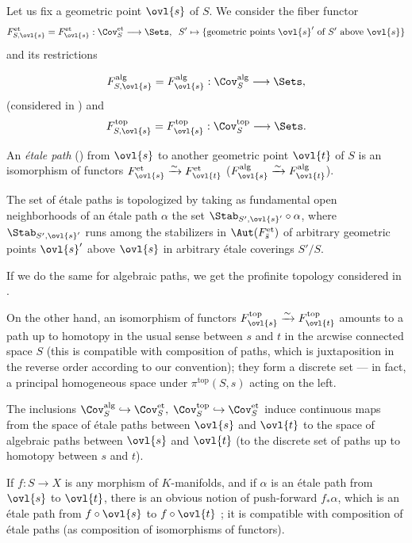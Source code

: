 \begin{para}\label{para::1.3.1} Let us fix a geometric point $\ovl{s}$ of
 $S$. We consider the fiber functor 
 \begin{equation*}
  F^{\mathrm{et}}_{S,\ovl{s}}=F^{\mathrm{et}}_{\ovl{s}} :
   \Cov^{\mathrm{et}}_S \longrightarrow \Sets,\;\; S' \mapsto
   \{\text{geometric points $\ovl{s}'$ of $S'$ above $\ovl{s}$}\}
 \end{equation*}
and its restrictions

\begin{equation*}
 F^{\mathrm{alg}}_{S,\ovl{s}}=F^{\mathrm{alg}}_{\ovl{s}}:
 \Cov^{\mathrm{alg}}_S\longrightarrow \Sets,
\end{equation*}
(considered in \cite{sga1}) and
\begin{equation*}
 F^{\mathrm{top}}_{S,\ovl{s}}=F^{\mathrm{top}}_{\ovl{s}}:
  \Cov^{\mathrm{top}}_S\longrightarrow \Sets.
\end{equation*} 

 An {\it \'etale path} () from
 $\ovl{s}$ to another geometric point $\ovl{t}$ of $S$ is an isomorphism
 of functors $F^{\mathrm{et}}_{\ovl{s}} \xrightarrow{\sim}
 F^{\mathrm{et}}_{\ovl{t}}$ (\resp $F^{\mathrm{alg}}_{\ovl{s}}
 \xrightarrow{\sim} F^{\mathrm{alg}}_{\ovl{t}}$). 

 The set of \'etale paths is topologized by taking as fundamental open
 neighborhoods of an \'etale path $\alpha$ the set 
 $\Stab_{S',\ovl{s}'}\circ \alpha$, where $\Stab_{S',\ovl{s}'}$ runs among
 the stabilizers in $\Aut(F_{\bar{s}}^{\mathrm{et}})$ of arbitrary geometric
 points $\ovl{s}'$ above 
 $\ovl{s}$ in arbitrary \'etale coverings $S'/S$.

 If we do the same for algebraic paths, we get the profinite topology
 considered in \cite{sga1}. 

 On the other hand, an isomorphism of functors
 $F^{\mathrm{top}}_{\ovl{s}} \xrightarrow{\sim}
 F^{\mathrm{top}}_{\ovl{t}}$ amounts to a path up to homotopy in the
 usual sense between $s$ and $t$ in the arcwise connected space $S$
 (this is compatible with composition of paths, which is juxtaposition
 in the reverse order according to our convention); they form a
 discrete set --- in fact, a principal homogeneous space under 
 $\pi^{\mathrm{top}}(S,s)$ acting on the left. 

 \medskip The inclusions $ \Cov^{\mathrm{alg}}_S \hookrightarrow
 \Cov^{\mathrm{et}}_S ,\;\Cov^{\mathrm{top}}_S \hookrightarrow
 \Cov^{\mathrm{et}}_S$ induce continuous maps from the space of \'etale
 paths between $\ovl{s}$ and $\ovl{t}$ to the space of algebraic paths
 between $\ovl{s}$ and $\ovl{t}$ (\resp to the discrete set of paths up
 to homotopy between $s$ and $t$).

 \medskip\noindent If $f: S\to X$ is any morphism of $K$-manifolds, and
 if $\alpha$ is an \'etale path from $\ovl{s}$ to $\ovl{t}$, there is an 
 obvious notion of push-forward $f_\ast\alpha$, which is an \'etale path
 from $f\circ \ovl{s}$ to $f\circ \ovl{t}$ ; it is compatible with
 composition of \'etale paths (as composition of isomorphisms of functors).
\end{para}

